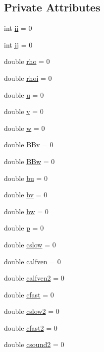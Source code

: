 \subsection*{Private Attributes}
\begin{DoxyCompactItemize}
\item 
int \hyperlink{classEigen_a4b673cadea3826951103971373749755}{ii} = 0
\item 
int \hyperlink{classEigen_a6c01ba28c8638ee116d595e466a8bd6d}{jj} = 0
\item 
double \hyperlink{classEigen_a646fa6580c8abd9d968e51645799e3bf}{rho} = 0
\item 
double \hyperlink{classEigen_a7e915698562002239d3c9cbd57d82334}{rhoi} = 0
\item 
double \hyperlink{classEigen_a9f7b7ec895023203196bfb4b12b2697c}{u} = 0
\item 
double \hyperlink{classEigen_a816699c51e29012ae53e5fb3096123ca}{v} = 0
\item 
double \hyperlink{classEigen_adbbc0e62f3a0cb4a6e0da2722657a524}{w} = 0
\item 
double \hyperlink{classEigen_ae770fea27b6a30250c5f43b89c0724b8}{B\+Bv} = 0
\item 
double \hyperlink{classEigen_a13064097603eadd4b2efd4000800b640}{B\+Bw} = 0
\item 
double \hyperlink{classEigen_aed2cd8dc2daaf33f52d009386a091096}{bu} = 0
\item 
double \hyperlink{classEigen_a72a8c197fecfdd434b5c2863a00e3ba0}{bv} = 0
\item 
double \hyperlink{classEigen_ada874d67f24ad446fcb5f9c797d39b63}{bw} = 0
\item 
double \hyperlink{classEigen_a06929fb8d011df1c58fde1486e54a7a1}{p} = 0
\item 
double \hyperlink{classEigen_aedf1e70a55fc3f9917bcaf4c386d7957}{cslow} = 0
\item 
double \hyperlink{classEigen_a637fc44639e37dd0d9edd0ab764462db}{calfven} = 0
\item 
double \hyperlink{classEigen_ace4b096410afc73f6e01f5e97f121a45}{calfven2} = 0
\item 
double \hyperlink{classEigen_abbcac99d3d2325b60ddfb7240bde9464}{cfast} = 0
\item 
double \hyperlink{classEigen_adf1df050d6ddc1098315e88c31d2dbec}{cslow2} = 0
\item 
double \hyperlink{classEigen_ae7cb990b9abbfa7412648bd1ee472a29}{cfast2} = 0
\item 
double \hyperlink{classEigen_a1fc1267dd40506297059046aac157263}{csound2} = 0

\end{DoxyCompactItemize}
